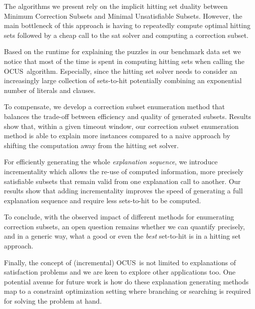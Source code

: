 \documentclass[a4paper,UKenglish,cleveref, autoref, thm-restate, pdfa]{lipics-v2021}
\newcommand\comus{\textsc{OCUS}}
\begin{document}
The algorithms we present rely on the implicit hitting set duality between Minimum Correction Subsets and Minimal Unsatisfiable Subsets.
However, the main bottleneck of this approach is having to repeatedly compute optimal hitting sets followed by a cheap call to the sat solver and computing a correction subset.

Based on the runtime for explaining the puzzles in our benchmark data set we notice that most of the time is spent in computing hitting sets when calling the \comus~algorithm.
Especially, since the hitting set solver needs to consider an increasingly large collection of sets-to-hit potentially combining an exponential number of literals and clauses.

To compensate, we develop a correction subset enumeration method that balances the trade-off between efficiency and quality of generated subsets.
Results show that, within a given timeout window, our correction subset enumeration method is able to explain more instances compared to a naive approach by shifting the computation away from the hitting set solver.

For efficiently generating the whole \emph{explanation sequence}, we introduce incrementality which allows the re-use of computed information, more precisely satisfiable subsets that remain valid from one explanation call to another.
Our results show that adding incrementality improves the speed of generating a full explanation sequence and require less sets-to-hit to be computed.


To conclude, with the observed impact of different methods for enumerating correction subsets, an open question remains whether we can quantify precisely, and in a generic way, what a good or even the \emph{best} set-to-hit is in a hitting set approach. 



Finally, the concept of (incremental) \comus~is not limited to explanations of satisfaction problems and we are keen to explore other applications too.
One potential avenue for future work is how do these explanation generating methods map to a constraint optimization setting where branching or searching is required for solving the problem at hand. 

\end{document}
